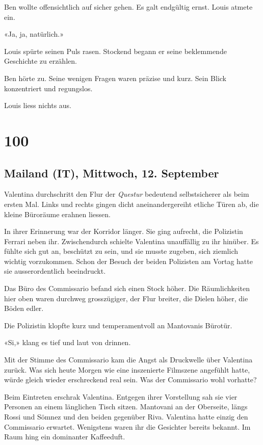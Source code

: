 Ben wollte offensichtlich auf sicher gehen. Es galt endgültig ernst.
Louis atmete ein.

«Ja, ja, natürlich.»

Louis spürte seinen Puls rasen. Stockend begann er seine beklemmende
Geschichte zu erzählen.

Ben hörte zu. Seine wenigen Fragen waren präzise und kurz. Sein Blick
konzentriert und regungslos.

Louis liess nichts aus.

\chapter{100}\label{section-100}

\section{Mailand (IT), Mittwoch, 12.
September}\label{mailand-it-mittwoch-12.-september}

Valentina durchschritt den Flur der \emph{Questur} bedeutend
selbstsicherer als beim ersten Mal. Links und rechts gingen dicht
aneinandergereiht etliche Türen ab, die kleine Büroräume erahnen
liessen.

In ihrer Erinnerung war der Korridor länger. Sie ging aufrecht, die
Polizistin Ferrari neben ihr. Zwischendurch schielte Valentina
unauffällig zu ihr hinüber. Es fühlte sich gut an, beschützt zu sein,
und sie musste zugeben, sich ziemlich wichtig vorzukommen. Schon der
Besuch der beiden Polizisten am Vortag hatte sie ausserordentlich
beeindruckt.

Das Büro des Commissario befand sich einen Stock höher. Die
Räumlichkeiten hier oben waren durchweg grosszügiger, der Flur breiter,
die Dielen höher, die Böden edler.

Die Polizistin klopfte kurz und temperamentvoll an Mantovanis Bürotür.

«Si,» klang es tief und laut von drinnen.

Mit der Stimme des Commissario kam die Angst als Druckwelle über
Valentina zurück. Was sich heute Morgen wie eine inszenierte Filmszene
angefühlt hatte, würde gleich wieder erschreckend real sein. Was der
Commissario wohl vorhatte?

Beim Eintreten erschrak Valentina. Entgegen ihrer Vorstellung sah sie
vier Personen an einem länglichen Tisch sitzen. Mantovani an der
Oberseite, längs Rossi und Sömnez und den beiden gegenüber Riva.
Valentina hatte einzig den Commissario erwartet. Wenigstens waren ihr
die Gesichter bereits bekannt. Im Raum hing ein dominanter Kaffeeduft.


